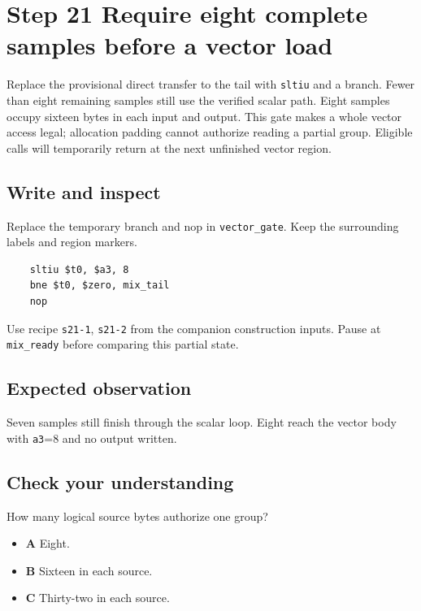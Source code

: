 \section{Step 21 Require eight complete samples before a vector load}\label{pcm-s21}

Replace the provisional direct transfer to the tail with \texttt{sltiu} and a branch. Fewer than eight remaining samples still use the verified scalar path. Eight samples occupy sixteen bytes in each input and output. This gate makes a whole vector access legal; allocation padding cannot authorize reading a partial group. Eligible calls will temporarily return at the next unfinished vector region.

\subsection{Write and inspect}
Replace the temporary branch and nop in \texttt{vector\_gate}. Keep the surrounding labels and region markers.

\begin{verbatim}
    sltiu $t0, $a3, 8
    bne $t0, $zero, mix_tail
    nop
\end{verbatim}
Use recipe \texttt{s21-1}, \texttt{s21-2} from the companion construction inputs. Pause at \texttt{mix\_ready} before comparing this partial state.

\subsection{Expected observation}
Seven samples still finish through the scalar loop. Eight reach the vector body with \texttt{a3}=8 and no output written.

\subsection{Check your understanding}
How many logical source bytes authorize one group?

\begin{itemize}
  \item \textbf{A} Eight.
  \item \textbf{B} Sixteen in each source.
  \item \textbf{C} Thirty-two in each source.
\end{itemize}
